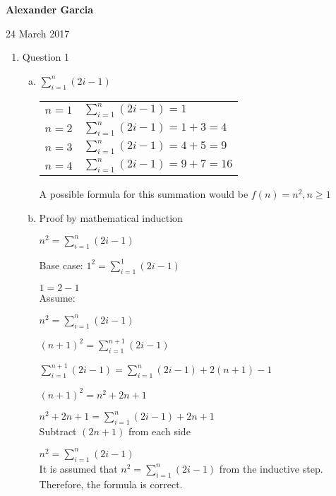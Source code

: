 \documentclass[11pt]{article}
\begin{document}
\textbf{Alexander Garcia}

24 March 2017 \\
\begin{enumerate}

	\item Question 1

		\begin{enumerate}[(a)]

			\item $\sum^{n}_{i=1}(2i-1)$

				\begin{tabular}{ll}
					$n = 1$ & $\sum^{n}_{i=1} (2i-1) = 1$ \\

					$n = 2$ & $\sum^{n}_{i=1} (2i-1) = 1 + 3 = 4$ \\

					$n = 3$ & $\sum^{n}_{i=1} (2i-1) = 4 + 5 = 9$ \\

					$n = 4$ & $\sum^{n}_{i=1} (2i-1) = 9 + 7 = 16$ \\
				\end{tabular}

				A possible formula for this summation would be
				$f(n) = n^2, n \geq 1$ \\

			\item Proof by mathematical induction

				$n^2 = \sum^{n}_{i=1} (2i-1)$

				Base case: $1^2 = \sum^{1}_{i=1} (2i-1)$

				$1 = 2-1$ \\

				Assume:

				$n^2 = \sum^{n}_{i=1} (2i-1)$

				$(n+1)^2 = \sum^{n+1}_{i=1} (2i-1)$

				$\sum^{n+1}_{i=1} (2i-1) = \sum^{n}_{i=1} (2i-1) + 2(n+1)-1$

				$(n+1)^2 = n^2 + 2n + 1$

				$n^2 + 2n + 1 = \sum^{n}_{i=1} (2i-1) + 2n + 1$ \\

				Subtract $(2n+1)$ from each side

				$n^2 = \sum^{n}_{i=1} (2i-1)$ \\

				It is assumed that $n^2 = \sum^{n}_{i=1} (2i-1)$ from the
				inductive step. Therefore, the formula is correct.\\


\end{enumerate}
\end{enumerate}
\end{document}
